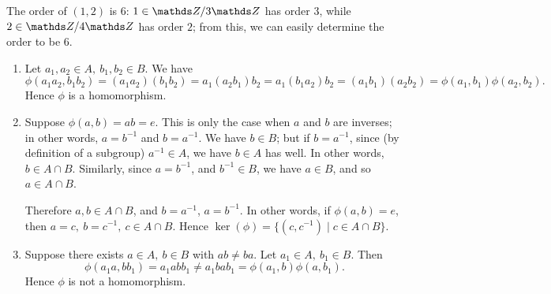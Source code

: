 \documentclass{homework}
\begin{document}
\begin{solution}
  The order of $(1,2)$ is $6$: $1\in \Z / 3\Z$ has order $3$, while $2\in \Z / 4\Z$ has order $2$;
  from this, we can easily determine the order to be $6$.

  \begin{enumerate}[label=(\alph*)]
    \item Let $a_1,a_2\in A,\ b_1,b_2\in B $. We have \[
        \phi(a_1a_2,b_1b_2) =
        (a_1a_2)(b_1b_2)=a_1(a_2b_1)b_2=a_1(b_1a_2)b_2=(a_1b_1)(a_2b_2)=\phi(a_1,b_1)\phi(a_2,b_2)
      .\] Hence $\phi$ is a homomorphism.
    \item Suppose $\phi(a,b)=ab=e$. This is only the case when $a$ and $b$ are inverses; in other
      words, $a=b^{-1}$ and $b=a^{-1}$. We have $b\in B$; but if $b=a^{-1}$, since (by definition of a
      subgroup) $a^{-1}\in A$, we have $b\in A$ has well. In other words, $b\in A\cap B$. Similarly,
      since $a=b^{-1}$, and $b^{-1}\in B$, we have $a\in B$, and so $a\in A\cap B$.

      Therefore $a,b\in A\cap B$, and $b=a^{-1}$, $a=b^{-1}$. In other words, if $\phi(a,b)=e$,
      then $a=c,\ b=c^{-1},\ c\in A\cap B$. Hence $\ker(\phi)=\{ (c,c^{-1})\mid c\in A\cap B \}$.
    \item Suppose there exists $a\in A,\ b\in B$ with $ab\neq ba$. Let $a_1\in A,\ b_1\in
      B$. Then \[
        \phi(a_1a,bb_1)=a_1abb_1\neq a_1bab_1=\phi(a_1,b)\phi(a,b_1)
      .\] Hence $\phi$ is not a homomorphism.
  \end{enumerate}
\end{solution}
\end{document}
